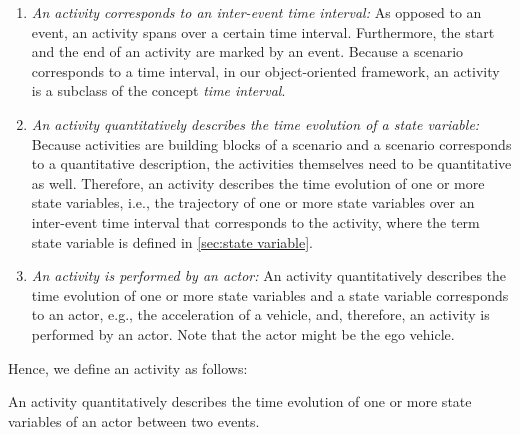 \begin{enumerate}
	\item\textit{An activity corresponds to an inter-event time interval:}
	As opposed to an event, an activity spans over a certain time interval. Furthermore, the start and the end of an activity are marked by an event.
	\cstartb Because a scenario corresponds to a time interval, in our object-oriented framework, an activity is a subclass of the concept \emph{time interval}. \cendb
	
	\item\textit{An activity quantitatively describes the time evolution of a state variable:}
	Because activities are building blocks of a scenario and a scenario corresponds to a quantitative description, the activities themselves need to be quantitative as well. 
	Therefore, an activity describes the time evolution of one or more state variables, i.e., the trajectory of one or more state variables over an inter-event time interval that corresponds to the activity, where the term state variable is defined in \cref{sec:state variable}.
	
	\item\textit{An activity is performed by an actor:}
	An activity quantitatively describes the time evolution of one or more state variables and a state variable corresponds to an actor, e.g., the acceleration of a vehicle, and, therefore, an activity is performed by an actor. Note that the actor might be the ego vehicle. 
\end{enumerate}

Hence, we define an activity as follows:
\begin{definition}[Activity]
	\label{def:activity}
	An activity quantitatively describes the time evolution of one or more state variables of an actor between two events.
\end{definition}



